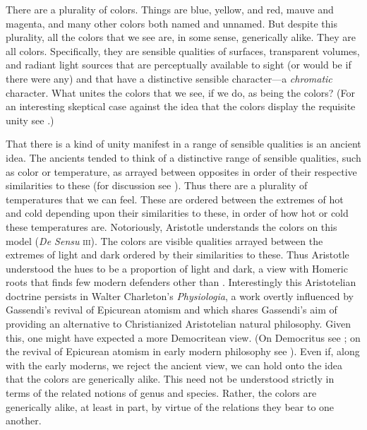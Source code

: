 \documentclass[12pt]{article}
\begin{document}

There are a plurality of colors. Things are blue, yellow, and red, mauve and magenta, and many other colors both named and unnamed. But despite this plurality, all the colors that we see are, in some sense, generically alike. They are all colors. Specifically, they are sensible qualities of surfaces, transparent volumes, and radiant light sources that are perceptually available to sight (or would be if there were any) and that have a distinctive sensible character---a \emph{chromatic} character. What unites the colors that we see, if we do, as being the colors? (For an interesting skeptical case against the idea that the colors display the requisite unity see \citealt{Matthen:1999ma}.)

That there is a kind of unity manifest in a range of sensible qualities is an ancient idea. The ancients tended to think of a distinctive range of sensible qualities, such as color or temperature, as arrayed between opposites in order of their respective similarities to these (for discussion see \citealt{Lloyd:1966ly}). Thus there are a plurality of temperatures that we can feel. These are ordered between the extremes of hot and cold depending upon their similarities to these, in order of how hot or cold these temperatures are. Notoriously, Aristotle understands the colors on this model (\emph{De Sensu} \textsc{iii}). The colors are visible qualities arrayed between the extremes of light and dark ordered by their similarities to these. Thus Aristotle understood the hues to be a proportion of light and dark, a view with Homeric roots \citep{Gladstone:1858fk} that finds few modern defenders other than \citet{Goethe:1810uq}. Interestingly this Aristotelian doctrine persists in Walter Charleton's \citeyear{Charleton:1654fk} \emph{Physiologia}, a work overtly influenced by Gassendi's revival of Epicurean atomism and which shares Gassendi's aim of providing an alternative to Christianized Aristotelian natural philosophy. Given this, one might have expected a more Democritean view. (On Democritus see \citealt{Lee:2005qr,Pasnau:2007kx}; on the revival of Epicurean atomism in early modern philosophy see \citealt{Wilson:2008nr}). Even if, along with the early moderns, we reject the ancient view, we can hold onto the idea that the colors are generically alike. This need not be understood strictly in terms of the related notions of genus and species. Rather, the colors are generically alike, at least in part, by virtue of the relations they bear to one another. 
\end{document}
